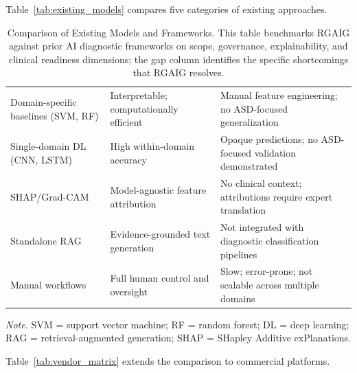 Table~\ref{tab:existing_models} compares five categories of existing approaches.

\begin{table}[H]
\tablestripes\tablefontsize
\caption[Comparison of Existing Models and Frameworks]{Comparison of Existing Models and Frameworks. This table benchmarks RGAIG against prior AI diagnostic frameworks on scope, governance, explainability, and clinical readiness dimensions; the gap column identifies the specific shortcomings that RGAIG resolves.}
\tablefontsize
\begin{tabularx}{\textwidth}{@{} L L L @{}}
\toprule
{} &  &  \\
\midrule
Domain-specific baselines (SVM, RF) & Interpretable; computationally efficient & Manual feature engineering; no ASD-focused generalization \\
Single-domain DL (CNN, LSTM) & High within-domain accuracy & Opaque predictions; no ASD-focused validation demonstrated \\
SHAP/Grad-CAM & Model-agnostic feature attribution & No clinical context; attributions require expert translation \\
Standalone RAG & Evidence-grounded text generation & Not integrated with diagnostic classification pipelines \\
Manual workflows & Full human control and oversight & Slow; error-prone; not scalable across multiple domains \\
\bottomrule
\end{tabularx}
\vspace{0.5em}\noindent\textit{Note.} SVM = support vector machine; RF = random forest; DL = deep learning; RAG = retrieval-augmented generation; SHAP = SHapley Additive exPlanations.
\end{table}

Table~\ref{tab:vendor_matrix} extends the comparison to commercial platforms.

